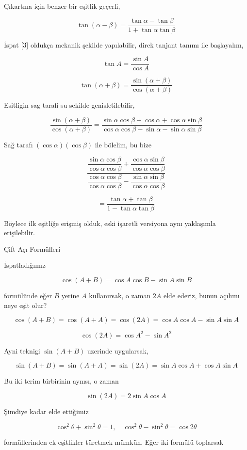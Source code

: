 \documentclass[12pt,fleqn]{article}\usepackage{../../common}
\begin{document}
Çıkartma için benzer bir eşitlik geçerli,

$$
\tan (\alpha - \beta) = \frac{\tan\alpha - \tan\beta}{1 + \tan\alpha \tan\beta}
$$

İspat [3] oldukça mekanik şekilde yapılabilir, direk tanjant tanımı ile başlayalım,

$$
\tan A = \frac{\sin A}{\cos A}
$$

$$
\tan (\alpha + \beta) = \frac{\sin (\alpha + \beta)}{\cos (\alpha + \beta)}
$$

Esitligin sag tarafi su sekilde genisletilebilir,

$$
\frac{\sin (\alpha + \beta)}{\cos (\alpha + \beta)} =
\frac{\sin\alpha \cos\beta + \cos\alpha + \cos\alpha \sin\beta }
     {\cos\alpha \cos\beta - \sin\alpha - \sin\alpha \sin\beta}
$$

Sağ tarafı $(\cos\alpha)(\cos\beta)$ ile bölelim, bu bize 

$$
\dfrac{\dfrac{\sin\alpha\cos\beta}{\cos\alpha\cos\beta} + \dfrac{\cos\alpha\sin\beta}{\cos\alpha\cos\beta}}
      {\dfrac{\cos\alpha\cos\beta}{\cos\alpha\cos\beta} - \dfrac{\sin\alpha\sin\beta}{\cos\alpha\cos\beta}}
$$

$$
= \frac{\tan\alpha + \tan\beta}{1 - \tan\alpha \tan\beta}
$$

Böylece ilk eşitliğe erişmiş olduk, eski işaretli versiyona aynı yaklaşımla erişilebilir.

Çift Açı Formülleri

İspatladığımız

$$
\cos(A+B) = \cos A \cos B - \sin A \sin B
$$

formülünde eğer $B$ yerine $A$ kullanırsak, o zaman $2A$ elde ederiz, bunun
açılımı neye eşit olur?

$$
\cos(A+B) = \cos(A+A) = \cos(2A) = \cos A \cos A - \sin A \sin A
$$

$$
\cos(2A) = \cos A^2 - \sin A^2
$$

Ayni teknigi $\sin(A+B)$ uzerinde uygularsak,

$$
\sin(A+B) = \sin(A+A) = \sin(2A) =
\sin A \cos A + \cos A \sin A
$$

Bu iki terim birbirinin aynısı, o zaman

$$
\sin(2A) = 2\sin A \cos A
$$

Şimdiye kadar elde ettiğimiz

$$
\cos^2\theta + \sin^2\theta = 1, \quad
\cos^2\theta - \sin^2\theta = \cos2\theta
$$

formüllerinden ek eşitlikler türetmek mümkün. Eğer iki formülü toplarsak
\end{document}
